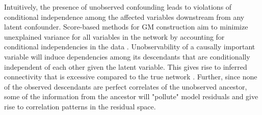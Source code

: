 \documentclass[letterpaper]{article}
\begin{document}
Intuitively, the presence of unobserved confounding leads to violations of conditional independence among the affected variables downstream from any latent confounder.  Score-based methods for GM construction aim to minimize unexplained variance for all variables in the network by accounting for conditional independencies in the data \cite{pearl_causality:_2000,friedman_being_2013}.  Unobservability of a causally important variable will induce dependencies among its descendants that are conditionally independent of each other given the latent variable.  This gives rise to inferred connectivity that is excessive compared to the true network \cite{elidan_discovering_2001}.  Further, since none of the observed descendants are perfect correlates of the unobserved ancestor, some of the information from the ancestor will "pollute" model residuals and give rise to correlation patterns in the residual space.   
\end{document}
